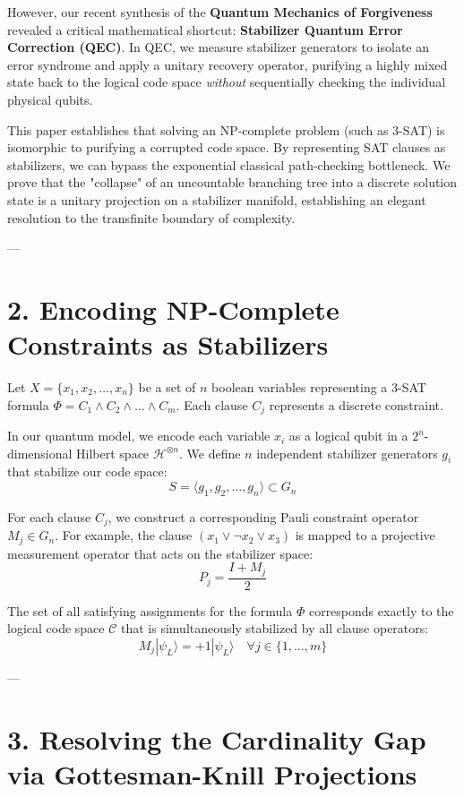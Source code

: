 \documentclass[11pt,twocolumn]{article}
\begin{document}
However, our recent synthesis of the \textbf{Quantum Mechanics of Forgiveness} revealed a critical mathematical shortcut: \textbf{Stabilizer Quantum Error Correction (QEC)}. In QEC, we measure stabilizer generators to isolate an error syndrome and apply a unitary recovery operator, purifying a highly mixed state back to the logical code space \textit{without} sequentially checking the individual physical qubits.

This paper establishes that solving an NP-complete problem (such as 3-SAT) is isomorphic to purifying a corrupted code space. By representing SAT clauses as stabilizers, we can bypass the exponential classical path-checking bottleneck. We prove that the "collapse" of an uncountable branching tree into a discrete solution state is a unitary projection on a stabilizer manifold, establishing an elegant resolution to the transfinite boundary of complexity.

---

\section{2. Encoding NP-Complete Constraints as Stabilizers}

Let $X = \{x_1, x_2, \dots, x_n\}$ be a set of $n$ boolean variables representing a 3-SAT formula $\Phi = C_1 \wedge C_2 \wedge \dots \wedge C_m$. Each clause $C_j$ represents a discrete constraint.

In our quantum model, we encode each variable $x_i$ as a logical qubit in a $2^n$-dimensional Hilbert space $\mathcal{H}^{\otimes n}$. We define $n$ independent stabilizer generators $g_i$ that stabilize our code space:
$$S = \langle g_1, g_2, \dots, g_n \rangle \subset G_n$$

For each clause $C_j$, we construct a corresponding Pauli constraint operator $M_j \in G_n$. For example, the clause $(x_1 \vee \neg x_2 \vee x_3)$ is mapped to a projective measurement operator that acts on the stabilizer space:
$$P_j = \frac{I + M_j}{2}$$

The set of all satisfying assignments for the formula $\Phi$ corresponds exactly to the logical code space $\mathcal{C}$ that is simultaneously stabilized by all clause operators:
$$M_j |\psi_L\rangle = +1 |\psi_L\rangle \quad \forall j \in \{1, \dots, m\}$$

---

\section{3. Resolving the Cardinality Gap via Gottesman-Knill Projections}
\end{document}
